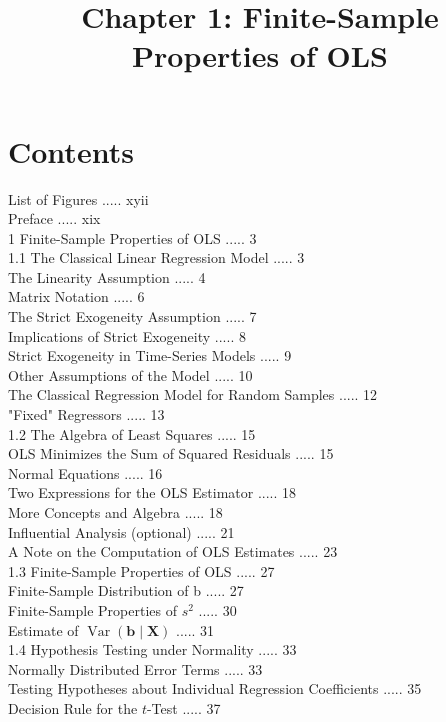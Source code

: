 \documentclass[10pt]{article}
\title{Chapter 1: Finite-Sample Properties of OLS}
\author{}
\date{}
\begin{document}
\maketitle

\section*{Contents}
List of Figures ..... xyii\\
Preface ..... xix\\
1 Finite-Sample Properties of OLS ..... 3\\
1.1 The Classical Linear Regression Model ..... 3\\
The Linearity Assumption ..... 4\\
Matrix Notation ..... 6\\
The Strict Exogeneity Assumption ..... 7\\
Implications of Strict Exogeneity ..... 8\\
Strict Exogeneity in Time-Series Models ..... 9\\
Other Assumptions of the Model ..... 10\\
The Classical Regression Model for Random Samples ..... 12\\
"Fixed" Regressors ..... 13\\
1.2 The Algebra of Least Squares ..... 15\\
OLS Minimizes the Sum of Squared Residuals ..... 15\\
Normal Equations ..... 16\\
Two Expressions for the OLS Estimator ..... 18\\
More Concepts and Algebra ..... 18\\
Influential Analysis (optional) ..... 21\\
A Note on the Computation of OLS Estimates ..... 23\\
1.3 Finite-Sample Properties of OLS ..... 27\\
Finite-Sample Distribution of b ..... 27\\
Finite-Sample Properties of $s^{2}$ ..... 30\\
Estimate of $\operatorname{Var}(\mathbf{b} \mid \mathbf{X})$ ..... 31\\
1.4 Hypothesis Testing under Normality ..... 33\\
Normally Distributed Error Terms ..... 33\\
Testing Hypotheses about Individual Regression Coefficients ..... 35\\
Decision Rule for the $t$-Test ..... 37\\
\end{document}
